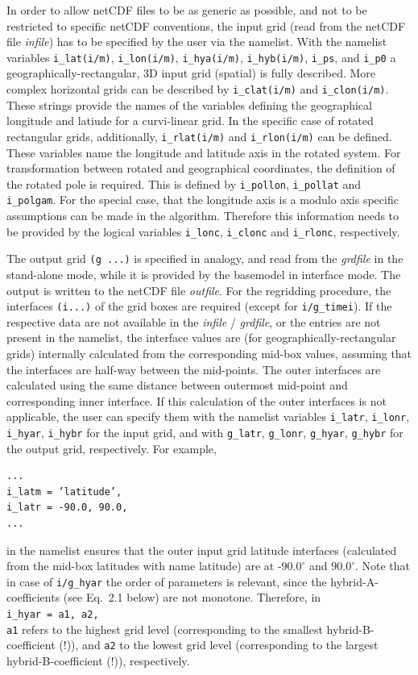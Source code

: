 \documentclass[11pt,twoside]{report}
\begin{document}
In order to allow netCDF files to be as generic as possible, and not to be
 restricted to
specific netCDF conventions, the input grid (read from the netCDF file 
{\it infile}) has to
be specified by the user via the namelist.
 With the namelist variables \verb|i_lat(i/m)|,
\verb|i_lon(i/m)|, \verb|i_hya(i/m)|, \verb|i_hyb(i/m)|, \verb|i_ps|, and 
\verb|i_p0|
 a geographically-rectangular, 3D input grid (spatial) is fully described.
More complex horizontal grids can be described by \verb|i_clat(i/m)| and 
\verb|i_clon(i/m)|. 
These strings provide the names of the variables defining the geographical 
longitude and 
latiude for a curvi-linear grid.
In the specific case of rotated rectangular grids, additionally, 
\verb|i_rlat(i/m)| and \verb|i_rlon(i/m)| can be defined. These variables 
name the longitude and latitude axis in the rotated system. 
For transformation between 
rotated and geographical coordinates, the definition of the rotated pole is 
required. This is defined by
\verb|i_pollon|, \verb|i_pollat| and \verb|i_polgam|.
For the special case, that the longitude axis is a modulo axis specific assumptions can be made in
the algorithm. Therefore this information needs to be provided by the logical variables
\verb|i_lonc|, \verb|i_clonc| and \verb|i_rlonc|, respectively. 

The output grid  \verb|(g ...)| is specified in analogy, and read from the
{\it grdfile} in the stand-alone mode, while it is provided by the basemodel
in interface mode. The output is written to the netCDF file {\it outfile}.
For the regridding procedure, the interfaces \verb|(i...)| of the grid boxes are required
(except for \verb|i/g_timei|). If the respective data are not
available in the  {\it infile} / {\it grdfile},
or the entries are not present in the namelist, the interface values are 
(for geographically-rectangular grids)
internally calculated from the corresponding mid-box values, assuming that the interfaces are
half-way between the mid-points. The outer interfaces are calculated using the
same distance between outermost mid-point and corresponding inner interface. If
this calculation of the outer interfaces is not applicable, the user can specify them
with the namelist variables \verb|i_latr|, \verb|i_lonr|, \verb|i_hyar|, \verb|i_hybr| for the
 input grid, and with \verb|g_latr|, \verb|g_lonr|, \verb|g_hyar|, \verb|g_hybr| for the 
output grid, respectively. For example,
\begin{verbatim}
...
i_latm = ’latitude’,
i_latr = -90.0, 90.0,
...
\end{verbatim}
in the namelist ensures that the outer input grid latitude interfaces (calculated from
the mid-box latitudes with name latitude) are at -$90.0^\circ$ and $90.0^\circ$. Note that in
case of \verb|i/g_hyar| the order of parameters is relevant, since the hybrid-A-coefficients
(see Eq.~2.1 below) are not monotone. Therefore, in \\
\verb|i_hyar = a1, a2,| \\
\verb|a1| refers to the highest grid level (corresponding to the smallest hybrid-B-coefficient
(!)), and \verb|a2| to the lowest grid level (corresponding to the largest hybrid-B-coefficient
(!)), respectively.
\end{document}
